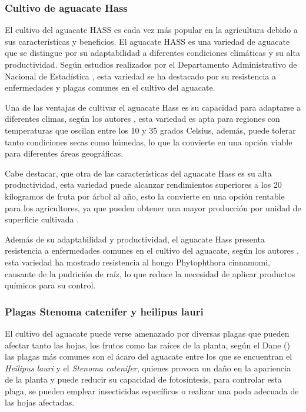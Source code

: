 \newpage


\subsubsection{Cultivo de aguacate Hass}

El cultivo del aguacate HASS es cada vez más popular en la agricultura debido a sus características y beneficios. El aguacate HASS es una variedad de aguacate que se distingue por su adaptabilidad a diferentes condiciones climáticas y su alta productividad. Según estudios realizados por el Departamento Administrativo de Nacional de Estadística \citep{dane2016cultivo}, esta variedad se ha destacado por su resistencia a enfermedades y plagas comunes en el cultivo del aguacate.

Una de las ventajas de cultivar el aguacate Hass es su capacidad para adaptarse a diferentes climas, según los autores \citet{reyes2022}, esta variedad es apta para regiones con temperaturas que oscilan entre los 10 y 35 grados Celsius, además, puede tolerar tanto condiciones secas como húmedas, lo que la convierte en una opción viable para diferentes áreas geográficas.

Cabe destacar, que  otra de las características  del aguacate Hass es su alta productividad, esta variedad puede alcanzar rendimientos superiores a los 20 kilogramos de fruta por árbol al año, esto la convierte en una opción rentable para los agricultores, ya que pueden obtener una mayor producción por unidad de superficie cultivada \citep{reyes2022}.

Además de su adaptabilidad y productividad, el aguacate Hass presenta resistencia a enfermedades comunes en el cultivo del aguacate, según los autores \citet{agapito2022}, esta variedad ha mostrado resistencia al hongo Phytophthora cinnamomi, causante de la pudrición de raíz, lo que reduce la necesidad de aplicar productos químicos para su control.

\subsubsection{Plagas Stenoma catenifer y heilipus lauri}

El cultivo del aguacate puede verse amenazado por diversas plagas que pueden afectar tanto las hojas, los frutos como las raíces de la planta, según  el Dane  (\citeyear{dane2016cultivo}) las plagas más comunes son el ácaro del aguacate entre los que se encuentran el \textit{Heilipus lauri} y el \textit{Stenoma catenifer}, quienes provoca un daño en la apariencia de la planta y puede reducir su capacidad de fotosíntesis, para controlar esta plaga, se pueden emplear insecticidas específicos o realizar una poda adecuada de las hojas afectadas.

